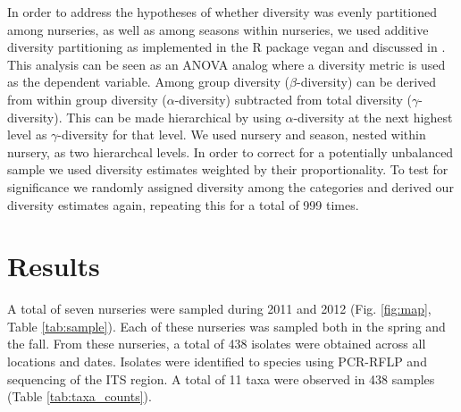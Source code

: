 \documentclass[12pt]{article}
\begin{document}
In order to address the hypotheses of whether diversity was evenly partitioned among nurseries, as well as among seasons within nurseries, we used additive diversity partitioning as implemented in the R package vegan \cite{vegan} and discussed in \cite{lande_1996, christ_etal_2003}.  This analysis can be seen as an ANOVA analog where a diversity metric is used as the dependent variable.  Among group diversity ($\beta$-diversity) can be derived from within group diversity ($\alpha$-diversity) subtracted from total diversity ($\gamma$-diversity).  This can be made hierarchical by using $\alpha$-diversity at the next highest level as $\gamma$-diversity for that level.  We used nursery and season, nested within nursery, as two hierarchcal levels.  In order to correct for a potentially unbalanced sample we used diversity estimates weighted by their proportionality.  To test for significance we randomly assigned diversity among the categories and derived our diversity estimates again, repeating this for a total of 999 times.


\section*{\sffamily\normalsize{Results}}

A total of seven nurseries were sampled during 2011 and 2012 (Fig. \ref{fig:map}, Table \ref{tab:sample}).  Each of these nurseries was sampled both in the spring and the fall.  From these nurseries, a total of 438 isolates were obtained across all locations and dates.  Isolates were identified to species using PCR-RFLP and sequencing of the ITS region. A total of 11 taxa were observed in 438 samples (Table \ref{tab:taxa_counts}).
\end{document}
